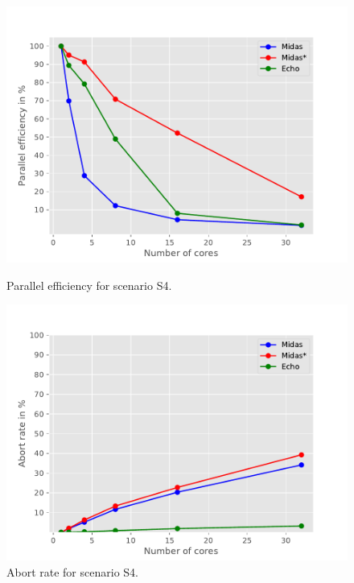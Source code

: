 \begin{figure}[h!]
\begin{minipage}[l]{0.50\textwidth}
    \includegraphics[width=\textwidth]{figures/bench/eff-ll}
    \caption{Parallel efficiency for scenario S4.}
    \label{fig:eff-s4}
\end{minipage}
\begin{minipage}[l]{0.50\textwidth}
    \includegraphics[width=\textwidth]{figures/bench/ar-ll}
    \caption{Abort rate for scenario S4.}
    \label{fig:ar-s4}
\end{minipage}
\end{figure}

\clearpage

